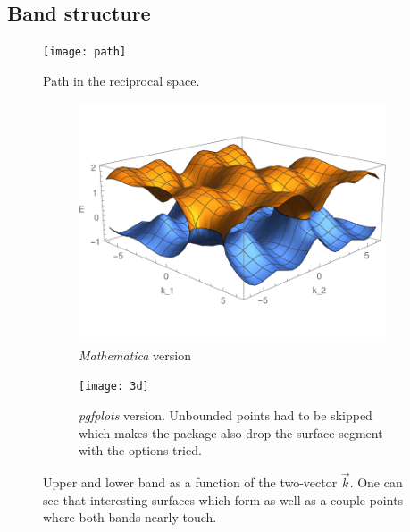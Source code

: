 \documentclass[11pt, english, fleqn, DIV=15, headinclude, BCOR=1cm]{scrartcl}
\begin{document}
\subsection{Band structure}

\begin{figure}
    \centering
    \texttt{[image: path]}
    \caption{%
        Path in the reciprocal space.
    }
    \label{fig:path}
\end{figure}

\begin{figure}
    \begin{subfigure}[c]{0.49\linewidth}
    \centering
    \includegraphics[width=\linewidth]{2-Eigenvalues.pdf}
    \caption{%
        \emph{Mathematica} version
    }
    \label{fig:}
    \end{subfigure}
    \hfill
    \begin{subfigure}[c]{0.49\linewidth}
    \centering
    \texttt{[image: 3d]}
    \caption{%
        \emph{pgfplots} version. Unbounded points had to be skipped which makes
        the package also drop the surface segment with the options tried.
    }
    \label{fig:}
    \end{subfigure}
    \caption{%
        Upper and lower band as a function of the two-vector $\vec k$. One can see that
        interesting surfaces which form as well as a couple points where both
        bands nearly touch.
    }
    \label{fig:band-3d}
\end{figure}
\end{document}

